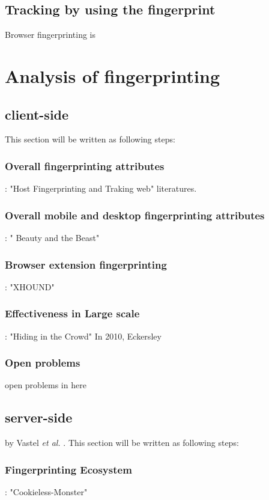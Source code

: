 \documentclass[sigconf]{acmart}   	%
\begin{document}
\subsection{Tracking by using the fingerprint}
Browser fingerprinting is  

\section{Analysis of fingerprinting}

\subsection{client-side}
This section will be written as following steps: 
\subsubsection*{\bf Overall fingerprinting attributes}
: "Host Fingerprinting and Traking web" literatures\cite{vastel2018fp, lim2016characterizing, miskovic2015appprint, bermejo2017steal, van2016accelerometer}.
\subsubsection*{\bf Overall mobile and desktop fingerprinting attributes}
 : " Beauty and the Beast"
\subsubsection*{\bf Browser extension fingerprinting }
: "XHOUND"
\subsubsection*{\bf Effectiveness in Large scale }
: "Hiding in the Crowd"
 In 2010, Eckersley\cite{eckersley2010unique} 
\subsubsection*{\bf Open problems}  
open problems in here

\subsection{server-side}
by Vastel \textit{et al.} \cite{vastel2018fp}.
This section will be written as following steps: 
\subsubsection*{\bf Fingerprinting Ecosystem}
 : "Cookieless-Monster"
\end{document}
